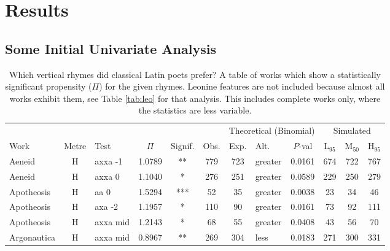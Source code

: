 \documentclass[twocolumn, switch]{article} %
\begin{document}
\section{Results}
\label{sec:results}

\subsection{Some Initial Univariate Analysis}

\begin{table}[h!]
\caption{
  Which vertical rhymes did classical Latin poets prefer? A table of works which
  show a statistically significant propensity ($\Pi$) for the given rhymes.
  Leonine features are not included because almost all works exhibit them, see
  Table \ref{tab:leo} for that analysis. This includes complete works only,
  where the statistics are less variable.
}
\label{tab:allbutleo}
\par\medskip
\centering
\begin{adjustbox}{totalheight=0.9\textheight}
  \begin{tabular}{lclcccclcc@{\hspace{1\tabcolsep}}c@{\hspace{1\tabcolsep}}c}
  \toprule
          &&&&&&\multicolumn{3}{c}{Theoretical (Binomial)}&\multicolumn{3}{c}{Simulated}\\\cmidrule(lr{2pt}){7-9}\cmidrule(l{2pt}r){10-12}
          Work & Metre &       Test &    $\Pi$ & Signif. &    Obs. &  Exp. & Alt. &  $P$-val & L$_{95}$ &  M$_{50}$ &  H$_{95}$ \\
  \midrule
        Aeneid &     H &   axxa -1 & 1.0789 &      ** &   779 &   723 &  greater &  0.0161 &      674 &      722 &      767 \\
        Aeneid &     H &    axxa 0 & 1.1040 &       * &   276 &   251 &  greater &  0.0589 &      229 &      250 &      279 \\
    Apotheosis &     H &      aa 0 & 1.5294 &     *** &    52 &    35 &  greater &  0.0038 &       23 &       34 &       46 \\
    Apotheosis &     H &    axa -2 & 1.1957 &       * &   110 &    90 &  greater &  0.0161 &       73 &       92 &      111 \\
    Apotheosis &     H &  axxa mid & 1.2143 &       * &    68 &    55 &  greater &  0.0408 &       43 &       56 &       70 \\
   Argonautica &     H &  axxa mid & 0.8967 &      ** &   269 &   304 &     less &  0.0183 &      271 &      300 &      331 \\

\end{tabular}
\end{adjustbox}
\end{table}
\end{document}
